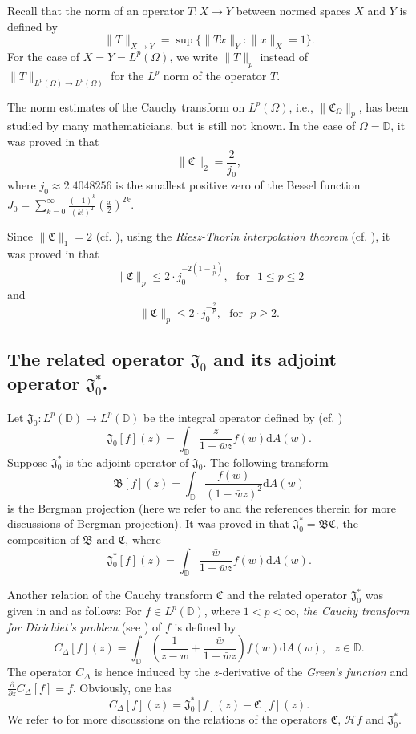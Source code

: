 \documentclass[a4paper,12pt]{amsart}
\theoremstyle{definition}
\numberwithin{equation}{section}
\newcounter {own}
\newcommand{\ID}{{\mathbb D}}
\begin{document}
Recall that the norm of an operator $T: X\rightarrow Y$ between normed spaces $X$ and $Y$ is defined by
$$\|T\|_{X\rightarrow Y}=\sup\{\|Tx\|_Y:\|x\|_X=1\}.$$
For the case of $X=Y=L^{p}(\Omega)$, we write $\|T\|_p$ instead of $\|T\|_{L^{p}(\Omega)\rightarrow L^{p}(\Omega)}$ for
the $L^p$ norm of the operator $T$.

The norm estimates of the Cauchy transform on $L^p(\Omega)$, i.e.,
$\|\mathfrak{C}_{\Omega}\|_{p}$,
has been studied by many mathematicians, but is still not known.
In the case of $\Omega=\ID$, it was proved in \cite{Anderson} that
$$\|\mathfrak{C}\|_{2}=\frac{2}{j_0},$$
where $j_0\approx2.4048256$ is the smallest positive zero of the Bessel function $J_0=\sum\limits_{k=0}^{\infty}\frac{(-1)^k}{(k!)^2}\left(\frac{x}{2}\right)^{2k}$.

Since $\|\mathfrak{C}\|_{1}=2$ (cf. \cite[(12)]{Dostanic}), using the {\it Riesz-Thorin interpolation theorem} (cf. \cite[Theorem 1.1.1]{Bergh}), it was proved in \cite[Theorem 1]{Dostanic} that
$$\|\mathfrak{C}\|_{p}\leq 2\cdot j_0^{-2(1-\frac{1}{p})}, \ \ \ \mbox{for}\ \ \ 1\leq p\leq2$$
and
$$\|\mathfrak{C}\|_{p}\leq 2\cdot j_0^{-\frac{2}{p}}, \ \ \ \mbox{for}\ \ \ p\geq 2.$$

\subsection{The related operator $\mathfrak{J}_0$ and its adjoint operator $\mathfrak{J}_0^*$.}
Let $\mathfrak{J}_0: L^p(\ID)\rightarrow L^p(\ID)$ be the integral operator defined by (cf. \cite[Page 9 and Page 12]{Baranov})
$$\mathfrak{J}_0[f](z)=\int_{\ID}\frac{z}{1-\bar{w}z}f(w)\mathrm{d}A(w) .$$
Suppose $\mathfrak{J}_0^*$ is the adjoint operator of $\mathfrak{J}_0$. The following transform
$$\mathfrak{B}[f](z)=\int_{\ID}\frac{f(w)}{(1-\bar{w}z)^2}\mathrm{d}A(w) $$
is the Bergman projection (here we refer to \cite{Hendenmalm,Perala,Zhukh} and the references therein for more discussions of Bergman projection).
It was proved in \cite[Page 12]{Baranov} that $\mathfrak{J}_0^*=\mathfrak{BC}$, the composition of $\mathfrak{B}$ and $\mathfrak{C}$,
where
$$\mathfrak{J}_0^*[f](z)=\int_{\ID}\frac{\bar{w}}{1-\bar{w}z}f(w)\mathrm{d}A(w) .$$

Another relation of the Cauchy transform $\mathfrak{C}$ and the related operator $\mathfrak{J}_0^*$ was given in \cite{Astala} and \cite{kalaj1} as follows:
For $f\in L^p(\ID)$, where $1<p<\infty$, {\it the Cauchy transform for Dirichlet's problem} (see \cite[Page 155]{Astala}) of $f$ is defined by
$$C_{\Delta}[f](z)=\int_{\ID}\left(\frac{1}{z-w}+\frac{\bar{w}}{1-\bar{w}z}\right)f(w)\mathrm{d}A(w) , \ \ \ z\in\ID.$$
The operator $C_{\Delta}$ is hence induced by the $z$-derivative of the {\it Green's function} and $\frac{\partial}{\partial{\bar{z}}}C_{\Delta}[f]=f$.
Obviously, one has
$$C_{\Delta}[f](z)=\mathfrak{J}_0^*[f](z)-\mathfrak{C}[f](z).$$
We refer to \cite{Baranov} for more discussions on the relations of the operators $\mathfrak{C}$, $\mathcal{H}f$ and $\mathfrak{J}_0^*$.
\end{document}
